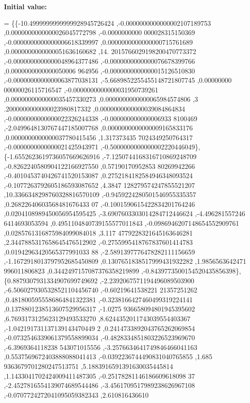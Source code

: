 {\bfseries Initial value\+:}
\begin{DoxyCode}
= \{\{-10.4999999999999928945726424 ,-0.0000000000000002107189753 ,0.0000000000000026045772798 ,-0.0000000000
      000028315150369 ,-0.0000000000000006618339997 ,0.0000000000000000715761689 ,0.0000000000000051636160682 ,14.
      2015766029198200470773372 ,-0.0000000000000048964377486 ,-0.0000000000000076678399766 ,0.0000000000000050006
      964956 ,-0.0000000000000015126510830 ,-0.0000000000000063877038131 ,-5.6689852255455148721807745 ,0.00000000
      00000026115716547 ,-0.0000000000000031950739261 ,0.0000000000000035457330273 ,0.0000000000000065984574806 ,3
      .2000000000000023980817332 ,0.0000000000000039084864834 ,-0.0000000000000022326244338 ,-0.000000000000006933
      8100469 ,-2.0499648130767447185007768 ,0.0000000000000009165833176 ,0.0000000000000037780415456 ,1.317373435
      7024349250764317 ,-0.0000000000000021425943971 ,-0.5000000000000002220446049\},
\{-1.6552623619736057669626916 ,-7.1250744168316710869248709 ,-0.8262240580904122166927550 ,0.57190170952853
      80269942266 ,-0.4010453740426741520153087 ,0.2752184182584946348093524 ,-0.1077263792605186593087652 ,4.3847
      128279574247855521207 ,10.3366348298760328816570109 ,-0.9459224280501546955335357 ,0.26822640603568481676433
      07 ,-0.1001590615422834201764246 ,0.0204108989450056954595425 ,-3.6907603303014284712446624 ,-4.496281557246
      6414693053594 ,0.4951104840739155577011843 ,-0.0986946207148654552909761 ,0.0285761316875984099084018 ,3.117
      4779228321645163646281 ,2.3447885317658645476512902 ,-0.2755995418767837601414783 ,0.01942963420565377991033
      88 ,-2.5891397776478282111156659 ,-1.1672918013797952685450809 ,0.1307651838517999431932282 ,1.9856563642471
      996011806823 ,0.3442497157087376358219899 ,-0.8439773500154520435856398\},
\{0.8879307931334907699749692 ,-2.2392067571194496089503900 ,-6.5060279305328521104456740 ,-0.60219641538221
      21357251262 ,0.4818005955586864841322381 ,-0.3238166427460499319224141 ,0.1378801238513607529956317 ,-1.0275
      936658094801945395602 ,6.7693173125623129493533270 ,8.6244352011743039554403367 ,-1.042191731137139143470449
      2 ,0.2414733892043765262069854 ,-0.0732546339061379558899034 ,-0.4828334851803226523969670 ,-6.3969364118238
      543071015556 ,-3.2576634641749846466041163 ,0.5537569672403888088041413 ,-0.0392236744490831040765855 ,1.685
      9363679701280247513751 ,5.1883916591391630035445814 ,1.1433041702424009411487305 ,-0.25178281146186609618098
      37 ,-2.4527816554139074689544486 ,-3.4561709517989238626967108 ,-0.0707724272041095059382343 ,2.610816436610

\end{DoxyCode}
